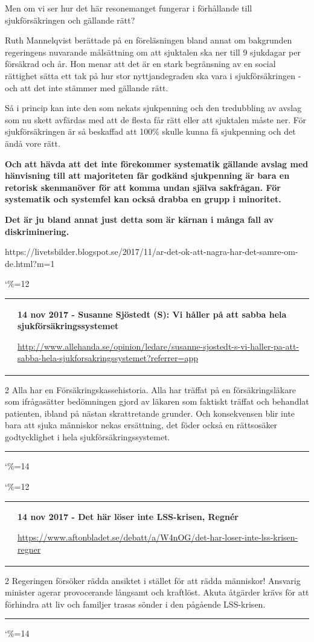 \documentclass[a4paper]{article}
\makeatletter
\newcommand{\entry}{
\catcode`\%=12
\@entry}
\newcommand{\@entry}[4][]{
\bigskip
\begin{tabular*}{\textwidth}{l m{\textwidth-4cm}}
\qrcode{#4} & \textbf{#2}

\medskip

\url{#4}

\end{tabular*}

\medskip


\begin{multicols}{2}
#3
\end{multicols}

#1

\medskip
\hrule

\catcode`\%=14
}
\makeatother
\begin{document}
{{{{{{Men om vi ser hur det här resonemanget fungerar i förhållande till sjukförsäkringen och gällande rätt?

Ruth Mannelqvist berättade på en föreläsningen  bland annat om bakgrunden regeringens nuvarande målsättning om att sjuktalen ska ner till 9 sjukdagar per försäkrad och år. Hon menar att det är en stark begränsning av en social rättighet sätta ett tak på hur stor nyttjandegraden ska vara i sjukförsäkringen - och att det inte stämmer med gällande rätt.

\begin{quotation}
\end{quotation}

Så i princip kan inte den  som nekats sjukpenning och den tredubbling av avslag som nu skett avfärdas med att de flesta får rätt eller att sjuktalen måste ner. För sjukförsäkringen är så beskaffad att 100\% skulle kunna få sjukpenning och det ändå vore rätt.

\textbf{Och att hävda att det inte förekommer systematik gällande avslag med hänvisning till att majoriteten får godkänd sjukpenning är bara en retorisk skenmanöver för att komma undan själva sakfrågan. För systematik och systemfel kan också drabba en grupp i minoritet.}

\textbf{Det är ju bland annat just detta som är kärnan i många fall av diskriminering.}}{https://livetsbilder.blogspot.se/2017/11/ar-det-ok-att-nagra-har-det-samre-om-de.html?m=1}

\entry{14 nov 2017 - Susanne Sjöstedt (S): Vi håller på att sabba hela sjukförsäkringssystemet}{Alla har en Försäkringskassehistoria. Alla har träffat på en försäkringsläkare som ifrågasätter bedömningen gjord av läkaren som faktiskt träffat och behandlat patienten, ibland på nästan skrattretande grunder. Och konsekvensen blir inte bara att sjuka människor nekas ersättning, det föder också en rättsosäker godtycklighet i hela sjukförsäkringssystemet.}{http://www.allehanda.se/opinion/ledare/susanne-sjostedt-s-vi-haller-pa-att-sabba-hela-sjukforsakringssystemet?referrer=app}

\entry{14 nov 2017 - Det här löser inte LSS-krisen, Regnér}{Regeringen försöker rädda ansiktet i stället för att rädda människor! Ansvarig minister agerar provocerande långsamt och kraftlöst. Akuta åtgärder krävs för att förhindra att liv och familjer trasas sönder i den pågående LSS-krisen.}{https://www.aftonbladet.se/debatt/a/W4nOG/det-har-loser-inte-lss-krisen-regner}

}}}}}
\end{document}
